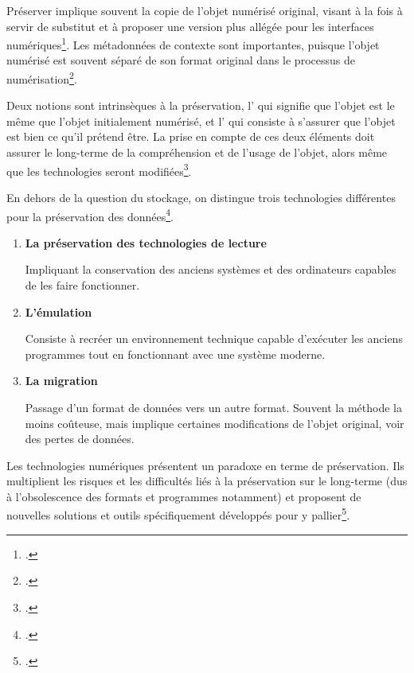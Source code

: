 Préserver implique souvent la copie de l'objet numérisé original, visant à la fois à servir de substitut et à proposer une version plus allégée pour les interfaces numériques\footcite{coutts_stepping_2017}. Les métadonnées de contexte sont importantes, puisque l'objet numérisé est souvent séparé de son format original dans le processus de numérisation\footcite{beaudoin_context_2012}.

Deux notions sont intrinsèques à la préservation, l' qui signifie que l'objet est le même que l'objet initialement numérisé, et l' qui consiste à s'assurer que l'objet est bien ce qu'il prétend être. La prise en compte de ces deux éléments doit assurer le long-terme de la compréhension et de l'usage de l'objet, alors même que les technologies seront modifiées\footcite{varniene-janssen_authenticity_2018}. 

En dehors de la question du stockage, on distingue trois technologies différentes pour la préservation des données\footcite{kowalczyk_digital_2018}. 
\begin{enumerate}
\item \textbf{La préservation des technologies de lecture}

Impliquant la conservation des anciens systèmes et des ordinateurs capables de les faire fonctionner.
\item \textbf{L'émulation}

Consiste à recréer un environnement technique capable d'exécuter les anciens programmes tout en fonctionnant avec une système moderne.

\item \textbf{La migration}

Passage d'un format de données vers un autre format. Souvent la méthode la moins coûteuse, mais implique certaines modifications de l'objet original, voir des pertes de données.

\end{enumerate}

Les technologies numériques présentent un paradoxe en terme de préservation. Ils multiplient les risques et les difficultés liés à la préservation sur le long-terme (dus à l'obsolescence des formats et programmes notamment) et proposent de nouvelles solutions et outils spécifiquement développés pour y pallier\footcite{xie_discover_2016}. 


